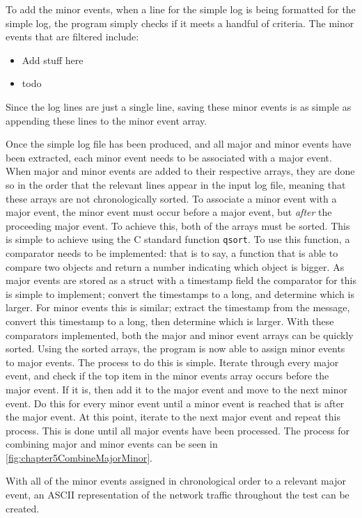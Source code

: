 To add the minor events, when a line for the simple log is being formatted for the simple log, the program simply checks if it meets a handful of criteria.
The minor events that are filtered include:
\begin{itemize}
    \item Add stuff here
    \item todo
\end{itemize}
Since the log lines are just a single line, saving these minor events is as simple as appending these lines to the minor event array.


Once the simple log file has been produced, and all major and minor events have been extracted, each minor event needs to be associated with a major event.
When major and minor events are added to their respective arrays, they are done so in the order that the relevant lines appear in the input log file, meaning that these arrays are not chronologically sorted.
To associate a minor event with a major event, the minor event must occur before a major event, but \emph{after} the proceeding major event.
To achieve this, both of the arrays must be sorted.
This is simple to achieve using the C standard function \verb|qsort|.
To use this function, a comparator needs to be implemented: that is to say, a function that is able to compare two objects and return a number indicating which object is bigger.
As major events are stored as a struct with a timestamp field the comparator for this is simple to implement; convert the timestamps to a long, and determine which is larger.
For minor events this is similar; extract the timestamp from the message, convert this timestamp to a long, then determine which is larger.
With these comparators implemented, both the major and minor event arrays can be quickly sorted.
Using the sorted arrays, the program is now able to assign minor events to major events.
The process to do this is simple. Iterate through every major event, and check if the top item in the minor events array occurs before the major event.
If it is, then add it to the major event and move to the next minor event. 
Do this for every minor event until a minor event is reached that is after the major event.
At this point, iterate to the next major event and repeat this process.
This is done until all major events have been processed.
The process for combining major and minor events can be seen in \figurename{ \ref{fig:chapter5CombineMajorMinor}}.

With all of the minor events assigned in chronological order to a relevant major event, an ASCII representation of the network traffic throughout the test can be created.

